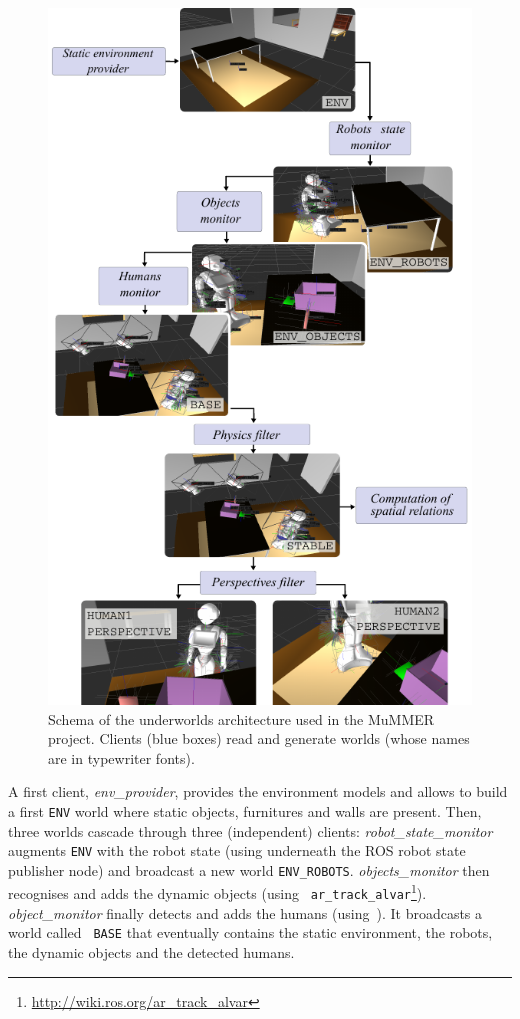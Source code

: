 \documentclass[letterpaper, 10pt, conference]{ieeeconf}
\newcommand{\uwds}{{\sc underworlds}\xspace}
\begin{document}
\begin{figure}
    \centering
    \includegraphics[width=\linewidth]{laasudws}
    \caption{Schema of the \uwds architecture used in the MuMMER project.
    Clients (blue boxes) read and generate worlds (whose names are in typewriter
    fonts).}
    \label{fig|mummerarchitecture}
\end{figure}

A first client, \textit{env\_provider}, provides the environment models and
allows to build a first \texttt{ENV} world where static objects, furnitures and
walls are present.  Then, three worlds cascade through three (independent)
clients: \textit{robot\_state\_monitor} augments {\tt ENV} with the robot state
(using underneath the ROS robot state publisher node) and broadcast a new world
{\tt ENV\_ROBOTS}. \textit{objects\_monitor} then recognises and adds the
dynamic objects (using {\tt
ar\_track\_alvar}\footnote{\url{http://wiki.ros.org/ar_track_alvar}}).
\textit{object\_monitor} finally detects and adds the humans
(using~\cite{Khalidov_Idiap-RR-02-2017}). It broadcasts a world called {\tt
BASE} that eventually contains the static environment, the robots, the dynamic
objects and the detected humans.
\end{document}
